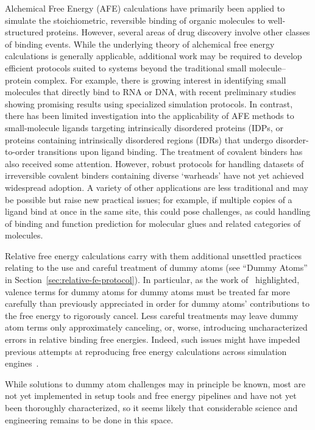 \documentclass[9pt,bestpractices]{livecoms}
\begin{document}
Alchemical Free Energy (AFE) calculations have primarily been applied to simulate the stoichiometric, reversible binding of organic molecules to well-structured proteins. However, several areas of drug discovery involve other classes of binding events. While the underlying theory of alchemical free energy calculations is generally applicable, additional work may be required to develop efficient protocols suited to systems beyond the traditional small molecule–protein complex.
For example, there is growing interest in identifying small molecules that directly bind to RNA or DNA, with recent preliminary studies showing promising results using specialized simulation protocols.\cite{Abramyan2025,Rasouli2024} In contrast, there has been limited investigation into the applicability of AFE methods to small-molecule ligands targeting intrinsically disordered proteins (IDPs,\cite{Papadourakis2024} or proteins containing intrinsically disordered regions (IDRs) that undergo disorder-to-order transitions upon ligand binding.\cite{MendozaMartinez2022}
The treatment of covalent binders has also received some attention.\cite{luo2021,zhang2019} However, robust protocols for handling datasets of irreversible covalent binders containing diverse ‘warheads’ have not yet achieved widespread adoption.\cite{Yu2019} A variety of other applications are less traditional and may be possible but raise new practical issues; for example, if multiple copies of a ligand bind at once in the same site, this could pose challenges, as could handling of binding and function prediction for molecular glues and related categories of molecules. 

Relative free energy calculations carry with them additional unsettled practices relating to the use and careful treatment of dummy atoms (see ``Dummy Atoms'' in Section~\ref{sec:relative-fe-protocol}). In particular, as the work of~\cite{Fleck_2021} highlighted, valence terms for dummy atoms for dummy atoms must be treated far more carefully than previously appreciated in order for dummy atoms' contributions to the free energy to rigorously cancel. Less careful treatments may leave dummy atom terms only approximately canceling, or, worse, introducing uncharacterized errors in relative binding free energies. Indeed, such issues might have impeded previous attempts at reproducing free energy calculations across simulation engines~\cite{loeffler2018reproducibility}. 

While solutions to dummy atom challenges may in principle be known, most are not yet implemented in setup tools and free energy pipelines and have not yet been thoroughly characterized, so it seems likely that considerable science and engineering remains to be done in this space. 
\end{document}
